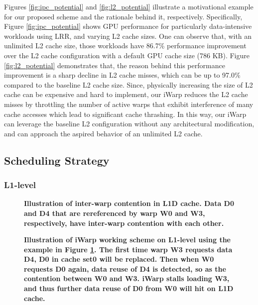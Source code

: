 \documentclass{sigplanconf}
\begin{document}
Figures \ref{fig:ipc_potential} and \ref{fig:l2_potential} illustrate a motivational example for our proposed scheme and the rationale behind it, respectively.
Specifically, Figure \ref{fig:ipc_potential} shows GPU performance for particularly data-intensive workloads using LRR, and varying L2 cache sizes. One can observe that, with an unlimited L2 cache size, those workloads have 86.7\% performance improvement over the L2 cache configuration with a default GPU cache size (786 KB). Figure \ref{fig:l2_potential} demonstrates that, the reason behind this performance improvement is a sharp decline in L2 cache misses, which can be up to 97.0\% compared to the baseline L2 cache size. Since, physically increasing the size of L2 cache can be expensive and hard to implement, our iWarp reduces the L2 cache misses by throttling the number of active warps that exhibit interference of many cache accesses which lead to significant cache thrashing. In this way, our iWarp can leverage the baseline L2 configuration without any architectural modification, and can approach the aspired behavior of an unlimited L2 cache.


\subsection{Scheduling Strategy}

\subsubsection{L1-level}

\begin{figure}
\begin{center}
\end{center}
\vspace{-10pt}
\caption{\textbf{Illustration of inter-warp contention in L1D cache. Data D0 and D4 that are rereferenced by warp W0 and W3, respectively, have inter-warp contention with each other.\label{fig:l1_contention}}}
\end{figure}

\begin{figure}
\begin{center}
\end{center}
\vspace{-10pt}
\caption{\textbf{Illustration of iWarp working scheme on L1-level using the example in Figure \ref{fig:l1_contention}. The first time warp W3 requests data D4, D0 in cache set0 will be replaced. Then when W0 requests D0 again, data reuse of D4 is detected, so as the contention between W0 and W3. iWarp stalls loading W3, and thus further data reuse of D0 from W0 will hit on L1D cache.\label{fig:iWarp_l1}}}
\end{figure}
\end{document}
